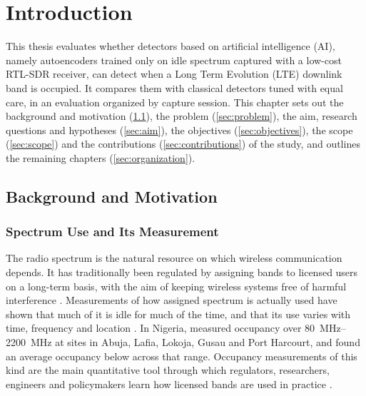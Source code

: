 
\chapter{Introduction}
\label{ch:introduction}

This thesis evaluates whether detectors based on artificial intelligence (AI), namely autoencoders trained only on idle spectrum captured with a low-cost RTL-SDR receiver, can detect when a Long Term Evolution (LTE) downlink band is occupied. It compares them with classical detectors tuned with equal care, in an evaluation organized by capture session. This chapter sets out the background and motivation (\cref{sec:background}), the problem (\cref{sec:problem}), the aim, research questions and hypotheses (\cref{sec:aim}), the objectives (\cref{sec:objectives}), the scope (\cref{sec:scope}) and the contributions (\cref{sec:contributions}) of the study, and outlines the remaining chapters (\cref{sec:organization}).

\section{Background and Motivation}
\label{sec:background}

\subsection{Spectrum Use and Its Measurement}
\label{sec:spectrum-use}

The radio spectrum is the natural resource on which wireless communication depends. It has traditionally been regulated by assigning bands to licensed users on a long-term basis, with the aim of keeping wireless systems free of harmful interference \parencite{popoola2018}. Measurements of how assigned spectrum is actually used have shown that much of it is idle for much of the time, and that its use varies with time, frequency and location \parencite{axell2010,popoola2018}. In Nigeria, \textcite{popoola2018} measured occupancy over \qtyrange{80}{2200}{\mega\hertz} at sites in Abuja, Lafia, Lokoja, Gusau and Port Harcourt, and found an average occupancy below  across that range. Occupancy measurements of this kind are the main quantitative tool through which regulators, researchers, engineers and policymakers learn how licensed bands are used in practice \parencite[p.~949]{popoola2018}.

